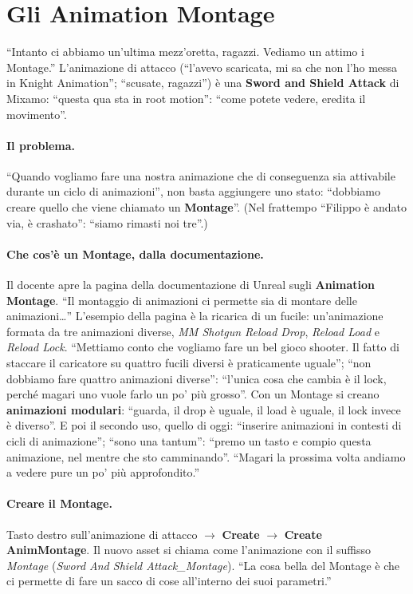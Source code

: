 \section{Gli Animation Montage}
\label{ue9:sec:montage}

``Intanto ci abbiamo un'ultima mezz'oretta, ragazzi. Vediamo un attimo i Montage.''
L'animazione di attacco (``l'avevo scaricata, mi sa che non l'ho messa in Knight
Animation''; ``scusate, ragazzi'') è una \textbf{Sword and Shield Attack} di Mixamo:
``questa qua sta in root motion'': ``come potete vedere, eredita il movimento''.

\paragraph{Il problema.} ``Quando vogliamo fare una nostra animazione che di conseguenza
sia attivabile durante un ciclo di animazioni'', non basta aggiungere uno stato: ``dobbiamo
creare quello che viene chiamato un \textbf{Montage}''. (Nel frattempo ``Filippo è andato
via, è crashato'': ``siamo rimasti noi tre''.)

\paragraph{Che cos'è un Montage, dalla documentazione.} Il docente apre la pagina della
documentazione di Unreal sugli \textbf{Animation Montage}. ``Il montaggio di animazioni ci
permette sia di montare delle animazioni\dots'' L'esempio della pagina è la ricarica di
un fucile: un'animazione formata da tre animazioni diverse, \emph{MM Shotgun Reload Drop},
\emph{Reload Load} e \emph{Reload Lock}. ``Mettiamo conto che vogliamo fare un bel gioco
shooter. Il fatto di staccare il caricatore su quattro fucili diversi è praticamente
uguale''; ``non dobbiamo fare quattro animazioni diverse'': ``l'unica cosa che cambia è il
lock, perché magari uno vuole farlo un po' più grosso''. Con un Montage si creano
\textbf{animazioni modulari}: ``guarda, il drop è uguale, il load è uguale, il lock invece
è diverso''. E poi il secondo uso, quello di oggi: ``inserire animazioni in contesti di
cicli di animazione''; ``sono una tantum'': ``premo un tasto e compio questa animazione,
nel mentre che sto camminando''. ``Magari la prossima volta andiamo a vedere pure un po'
più approfondito.''

\paragraph{Creare il Montage.} Tasto destro sull'animazione di attacco $\rightarrow$
\textbf{Create} $\rightarrow$ \textbf{Create AnimMontage}. Il nuovo asset si chiama come
l'animazione con il suffisso \emph{Montage} (\emph{Sword And Shield Attack\_Montage}).
``La cosa bella del Montage è che ci permette di fare un sacco di cose all'interno dei
suoi parametri.''

